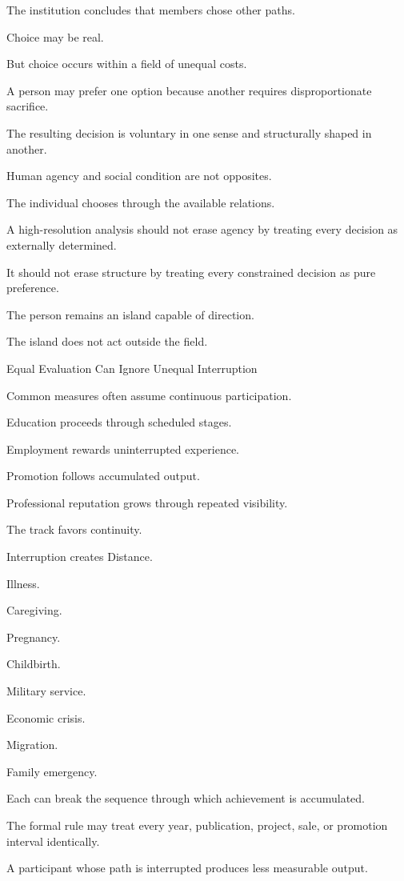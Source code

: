The institution concludes that members chose other paths.

Choice may be real.

But choice occurs within a field of unequal costs.

A person may prefer one option because another requires disproportionate sacrifice.

The resulting decision is voluntary in one sense and structurally shaped in another.

Human agency and social condition are not opposites.

The individual chooses through the available relations.

A high-resolution analysis should not erase agency by treating every decision as externally determined.

It should not erase structure by treating every constrained decision as pure preference.

The person remains an island capable of direction.

The island does not act outside the field.

Equal Evaluation Can Ignore Unequal Interruption

Common measures often assume continuous participation.

Education proceeds through scheduled stages.

Employment rewards uninterrupted experience.

Promotion follows accumulated output.

Professional reputation grows through repeated visibility.

The track favors continuity.

Interruption creates Distance.

Illness.

Caregiving.

Pregnancy.

Childbirth.

Military service.

Economic crisis.

Migration.

Family emergency.

Each can break the sequence through which achievement is accumulated.

The formal rule may treat every year, publication, project, sale, or promotion interval identically.

A participant whose path is interrupted produces less measurable output.

